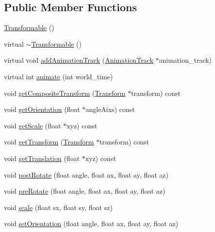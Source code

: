 \subsection*{Public Member Functions}
\begin{CompactItemize}
\item 
\hyperlink{classm3g_1_1Transformable_ca6563203e3e883391c9d0927028aa04}{Transformable} ()
\item 
virtual \hyperlink{classm3g_1_1Transformable_89d9c7912ed11a30a312fd8f72b9ab22}{$\sim$Transformable} ()
\item 
virtual void \hyperlink{classm3g_1_1Transformable_415c0b110f95410ded9b85e5d99a496b}{addAnimationTrack} (\hyperlink{classm3g_1_1AnimationTrack}{AnimationTrack} $\ast$animation\_\-track)
\item 
virtual int \hyperlink{classm3g_1_1Transformable_8aad1ceab4c2a03609c8a42324ce484d}{animate} (int world\_\-time)
\item 
void \hyperlink{classm3g_1_1Transformable_263ef66efed11b7f9678e2e4bbec4c55}{getCompositeTransform} (\hyperlink{classm3g_1_1Transform}{Transform} $\ast$transform) const 
\item 
void \hyperlink{classm3g_1_1Transformable_f4df4d4858762f23a5562f7192e6d53c}{getOrientation} (float $\ast$angleAixs) const 
\item 
void \hyperlink{classm3g_1_1Transformable_b8a2dd11d0ba90e138625eb86a6a6083}{getScale} (float $\ast$xyz) const 
\item 
void \hyperlink{classm3g_1_1Transformable_73f387f99c527b382c8aaa54b8af6ed6}{getTransform} (\hyperlink{classm3g_1_1Transform}{Transform} $\ast$transform) const 
\item 
void \hyperlink{classm3g_1_1Transformable_d8aec42959fecc3d76f9539d3afa3c8d}{getTranslation} (float $\ast$xyz) const 
\item 
void \hyperlink{classm3g_1_1Transformable_4abf135257f132cdf9580f3a3e11ea6c}{postRotate} (float angle, float ax, float ay, float az)
\item 
void \hyperlink{classm3g_1_1Transformable_718b606184672eec83263ad44d5c7431}{preRotate} (float angle, float ax, float ay, float az)
\item 
void \hyperlink{classm3g_1_1Transformable_d94deaf828db5e2dfd5e40db42b64cd9}{scale} (float sx, float sy, float sz)
\item 
void \hyperlink{classm3g_1_1Transformable_980a9a2b5f6102763042e616d3aa4606}{setOrientation} (float angle, float ax, float ay, float az)
\item 

\end{CompactItemize}
